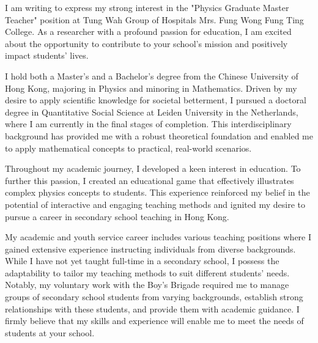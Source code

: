 \documentclass[11pt, a4paper]{awesome-cv}
\begin{document}
\makecvheader[R]

\makecvfooter
  {}%
  {}%
  {}

\makelettertitle

\begin{cvletter}

I am writing to express my strong interest in the "Physics Graduate Master Teacher" position at Tung Wah Group of Hospitals Mrs. Fung Wong Fung Ting College. As a researcher with a profound passion for education, I am excited about the opportunity to contribute to your school's mission and positively impact students' lives.

I hold both a Master's and a Bachelor's degree from the Chinese University of Hong Kong, majoring in Physics and minoring in Mathematics. Driven by my desire to apply scientific knowledge for societal betterment, I pursued a doctoral degree in Quantitative Social Science at Leiden University in the Netherlands, where I am currently in the final stages of completion. This interdisciplinary background has provided me with a robust theoretical foundation and enabled me to apply mathematical concepts to practical, real-world scenarios.

Throughout my academic journey, I developed a keen interest in education. To further this passion, I created an educational game that effectively illustrates complex physics concepts to students. This experience reinforced my belief in the potential of interactive and engaging teaching methods and ignited my desire to pursue a career in secondary school teaching in Hong Kong.

My academic and youth service career includes various teaching positions where I gained extensive experience instructing individuals from diverse backgrounds. While I have not yet taught full-time in a secondary school, I possess the adaptability to tailor my teaching methods to suit different students' needs. Notably, my voluntary work with the Boy's Brigade required me to manage groups of secondary school students from varying backgrounds, establish strong relationships with these students, and provide them with academic guidance. I firmly believe that my skills and experience will enable me to meet the needs of students at your school.


\end{cvletter}
\end{document}
